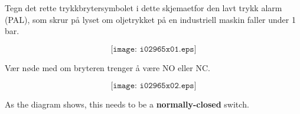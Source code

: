 

Tegn det rette trykkbrytersymbolet i dette skjemaetfor den lavt trykk alarm (PAL),  som skrur på lyset om oljetrykket på en industriell maskin faller under 1 bar. 

$$\texttt{[image: i02965x01.eps]}$$

Vær nøde med om bryteren trenger å være NO eller NC. 







$$\texttt{[image: i02965x02.eps]}$$

As the diagram shows, this needs to be a {\bf normally-closed} switch.











